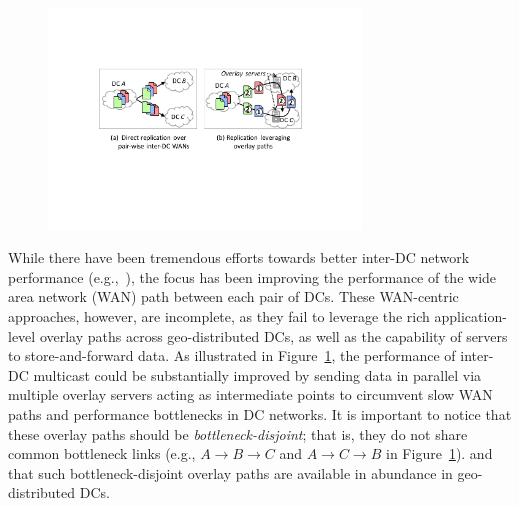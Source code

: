 \begin{figure}[t!]
\includegraphics[width=83mm]{images/intro-example-3.pdf}
\vspace{-0.4cm}
\label{fig:intro}
\vspace{-0.4cm}
\end{figure}

While there have been tremendous efforts towards better inter-DC
network performance (e.g.,~\cite{savage1999Theend,jain2013b4,
kumar2015bwe,hong2013achieving,zhang2015guarantee}), the focus has
been improving the performance of the wide area network (WAN) path
between each pair of DCs. These WAN-centric approaches, however, are
incomplete, as they fail to leverage the rich application-level
overlay paths across geo-distributed DCs, as well as the capability
of servers to store-and-forward data.
As illustrated in Figure~\ref{fig:intro}, the performance of inter-DC
multicast could be substantially improved by sending data in parallel
via multiple overlay servers acting as intermediate points to
circumvent slow WAN paths and performance bottlenecks in DC networks.
It is important to notice that these overlay paths should be {\em
bottleneck-disjoint}; that is, they do not share common bottleneck
links (e.g., $A$$\rightarrow$$B$$\rightarrow$$C$ and
$A$$\rightarrow$$C$$\rightarrow$$B$ in Figure~\ref{fig:intro}).
and that such bottleneck-disjoint overlay paths are available in
abundance in geo-distributed DCs.




